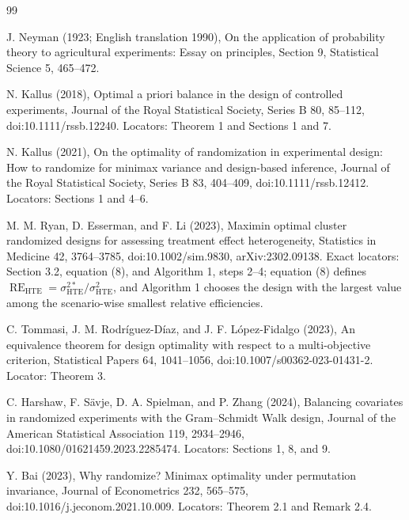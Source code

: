 \documentclass{article}
\begin{document}
\begin{thebibliography}{99}

   J. Neyman (1923; English translation 1990), On the application of probability theory to agricultural experiments: Essay on principles, Section 9, Statistical Science 5, 465--472.

   N. Kallus (2018), Optimal a priori balance in the design of controlled experiments, Journal of the Royal Statistical Society, Series B 80, 85--112, doi:10.1111/rssb.12240. Locators: Theorem 1 and Sections 1 and 7.

   N. Kallus (2021), On the optimality of randomization in experimental design: How to randomize for minimax variance and design-based inference, Journal of the Royal Statistical Society, Series B 83, 404--409, doi:10.1111/rssb.12412. Locators: Sections 1 and 4--6.

   M. M. Ryan, D. Esserman, and F. Li (2023), Maximin optimal cluster randomized designs for assessing treatment effect heterogeneity, Statistics in Medicine 42, 3764--3785, doi:10.1002/sim.9830, arXiv:2302.09138. Exact locators: Section 3.2, equation (8), and Algorithm 1, steps 2--4; equation (8) defines \(\operatorname{RE}_{\mathrm{HTE}}=\sigma_{\mathrm{HTE}}^{2*}/\sigma_{\mathrm{HTE}}^2\), and Algorithm 1 chooses the design with the largest value among the scenario-wise smallest relative efficiencies.

   C. Tommasi, J. M. Rodr\'iguez-D\'iaz, and J. F. L\'opez-Fidalgo (2023), An equivalence theorem for design optimality with respect to a multi-objective criterion, Statistical Papers 64, 1041--1056, doi:10.1007/s00362-023-01431-2. Locator: Theorem 3.

   C. Harshaw, F. S\"avje, D. A. Spielman, and P. Zhang (2024), Balancing covariates in randomized experiments with the Gram--Schmidt Walk design, Journal of the American Statistical Association 119, 2934--2946, doi:10.1080/01621459.2023.2285474. Locators: Sections 1, 8, and 9.

   Y. Bai (2023), Why randomize? Minimax optimality under permutation invariance, Journal of Econometrics 232, 565--575, doi:10.1016/j.jeconom.2021.10.009. Locators: Theorem 2.1 and Remark 2.4.

\end{thebibliography}
\end{document}
